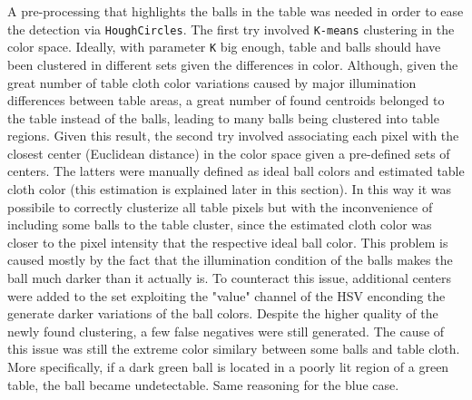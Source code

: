 A pre-processing that highlights the balls in the table was needed in order to ease the detection via \verb|HoughCircles|.
The first try involved \verb|K-means| clustering in the color space. Ideally, with parameter \verb|K| big enough, table and balls should have been
clustered in different sets given the differences in color. Although, given the great number of table cloth color variations caused by major illumination
differences between table areas, a great number of found centroids belonged to the table instead of the balls, leading to many balls being clustered
into table regions. Given this result, the second try involved associating each pixel with the closest center (Euclidean distance) in the color space given a pre-defined sets of centers.
The latters were manually defined as ideal ball colors and estimated table cloth color (this estimation is explained later in this section).
In this way it was possibile to correctly clusterize all table pixels but with the inconvenience of including some balls to the table cluster, since the estimated
cloth color was closer to the pixel intensity that the respective ideal ball color. This problem is caused mostly by the fact that the illumination condition of the balls
makes the ball much darker than it actually is. To counteract this issue, additional centers were added to the set exploiting the "value" channel of the HSV enconding
the generate darker variations of the ball colors. Despite the higher quality of the newly found clustering, a few false negatives were still generated.
The cause of this issue was still the extreme color similary between some balls and table cloth. More specifically, if a dark green ball is located in a poorly lit 
region of a green table, the ball became undetectable. Same reasoning for the blue case.

